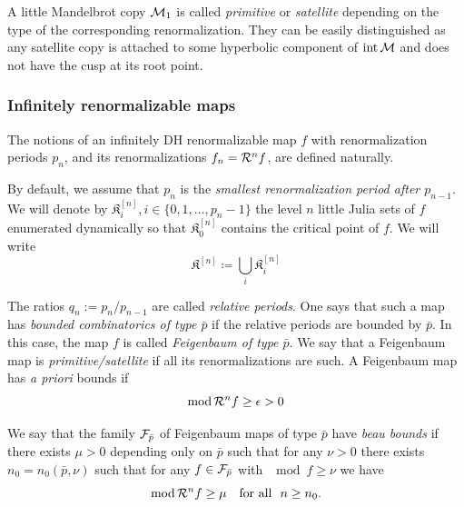 \documentclass{amsart}
\newcommand{\bfilled}{{\boldsymbol{\mathfrak K} }}
\newcommand{\filled}{{\mathfrak K }}
\newcommand{\1}{{\mathbb 1 }}
\begin{document}

A little Mandelbrot copy ${\mathcal M}_1$ is called {\it primitive} or {\it satellite} depending on  the type of the corresponding renormalization. They can be easily distinguished as any satellite copy is attached to
some hyperbolic component of $\operatorname{int} {\mathcal M}$ and does not have the cusp at its root point. 

\subsubsection{Infinitely renormalizable maps}\label{sss:infin renorm} The notions  of an infinitely DH renormalizable map $f$ with renormalization periods $p_n$, and its renormalizations $f_n= {\mathcal R}^n f$,
are defined naturally. 

By default, we assume that $p_n$ is the \emph{smallest renormalization period after $p_{n-1}$}. We will denote by $\filled^{[n]}_i, i\in \{0,1,\dots, p_n-1\}$ the level $n$ little Julia sets of $f$ enumerated dynamically so that $\filled^{[n]}_0$ contains the critical point of $f$. We will write
\begin{equation}
\label{eq:bfilled}
\bfilled^{[n]}\coloneqq \bigcup_i \filled^{[n]}_i
\end{equation}


 The ratios $q_n:= p_n/p_{n-1}$ are called {\em relative periods}.
One says that such a map has  {\it bounded combinatorics of type
  $\bar p$} 
if the relative periods are bounded by $\bar p$.
In this case, the  map $f$  is called {\em Feigenbaum of type $\bar p$}.
We say that a Feigenbaum map is {\it
  primitive/satellite}  if all its renormalizations are such.  
A Feigenbaum map has   {\it a priori} bounds if
\begin{equation}
\label{eq: ql a priori bounds}
\operatorname{mod} {\mathcal R}^n f\geq {\epsilon}>0
\end{equation}


We say that the family ${\mathcal F}_{\bar p}$ of Feigenbaum maps of type $\bar p$
have {\it beau bounds}
if there exists $\mu>0$ depending only on $\bar p$  such that for any $\nu>0$ there exists 
$n_0= n_0(\bar p, \nu)$ such that  for any  $f\in {\mathcal F}_{\bar p}$  with $\mod f\geq \nu$ we have
$$
    \operatorname{mod} {\mathcal R}^n f \geq \mu\quad  \text{for all }\ n\geq n_0. 
$$    
\end{document}
